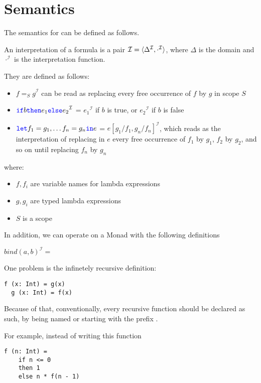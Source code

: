 \section{Semantics}

\newcommand{\I}[1]{\ensuremath{{#1}^{\mathcal{I}}}}

The semantics for \Soda can be defined as follows.

An interpretation of a \Soda formula is a pair $\mathcal{I} = \langle \Delta _\mathcal{\I} , \I{\cdot} \rangle$, where $\Delta$ is the domain and $\I{\cdot}$ is the interpretation function.

They are defined as follows:

\begin{itemize}
    \item $\I{f =_{S} g}$ can be read as replacing every free occurrence of $f$ by $g$ in scope $S$

    \item $\I{\sif b \sthen e_{1} \selse e_{2}}$ = \I{e_{1}} if $b$ is true, or \I{e_{2}} if $b$ is false

    \item ${\color{blue}\texttt{{let}}} f_{1} = g_{1}, \ldots f_{n} = g_{n} {\color{blue}\texttt{{in}}} e$ =
    \I{e[g_{1} / f_{1}, g_{n} / f_{n}]}, which reads as the interpretation of
    replacing in $e$ every free occurrence of $f_{1}$ by $g_{1}$, $f_{2}$ by $g_{2}$, and so on until replacing $f_{n}$ by $g_{n}$
\end{itemize}

where:
\begin{itemize}
    \item $f, f_{i}$ are variable names for lambda expressions
    \item $g, g_{i}$ are typed lambda expressions
    \item $S$ is a scope
\end{itemize}


In addition, we can operate on a Monad with the following definitions

$\I{bind(a, b)} = $


One problem is the infinetely recursive definition:
\begin{lstlisting}[label={lst:exampleOfRecursion}]
  f (x: Int) = g(x)
  g (x: Int) = f(x)
\end{lstlisting}

Because of that, conventionally, every recursive function should be declared as such, by being named or starting with the prefix .

For example, instead of writing this function
\begin{lstlisting}[label={lst:exampleOfFactorialBadNaming}]
  f (n: Int) =
    if n <= 0
    then 1
    else n * f(n - 1)
\end{lstlisting}

